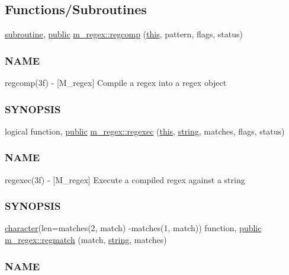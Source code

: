 \subsection*{Functions/\+Subroutines}
\begin{DoxyCompactItemize}
\item 
\hyperlink{M__stopwatch_83_8txt_acfbcff50169d691ff02d4a123ed70482}{subroutine}, \hyperlink{M__stopwatch_83_8txt_a2f74811300c361e53b430611a7d1769f}{public} \hyperlink{namespacem__regex_ac4e468cb031565f4f4744d8f4c9eee91}{m\+\_\+regex\+::regcomp} (\hyperlink{M__stopwatch_83_8txt_ad62a52042bb610eee5b36b5516caec22}{this}, pattern, flags, status)
\begin{DoxyCompactList}\small\item\em \subsubsection*{N\+A\+ME}

regcomp(3f) -\/ \mbox{[}M\+\_\+regex\mbox{]} Compile a regex into a regex object \subsubsection*{S\+Y\+N\+O\+P\+S\+IS}\end{DoxyCompactList}\item 
logical function, \hyperlink{M__stopwatch_83_8txt_a2f74811300c361e53b430611a7d1769f}{public} \hyperlink{namespacem__regex_a44394d605b1a98fb246bc4622a08f878}{m\+\_\+regex\+::regexec} (\hyperlink{M__stopwatch_83_8txt_ad62a52042bb610eee5b36b5516caec22}{this}, \hyperlink{what__overview_81_8txt_a74cb7e955273b9f9157b4f0c18a38849}{string}, matches, flags, status)
\begin{DoxyCompactList}\small\item\em \subsubsection*{N\+A\+ME}

regexec(3f) -\/ \mbox{[}M\+\_\+regex\mbox{]} Execute a compiled regex against a string \subsubsection*{S\+Y\+N\+O\+P\+S\+IS}\end{DoxyCompactList}\item 
\hyperlink{option__stopwatch_83_8txt_abd4b21fbbd175834027b5224bfe97e66}{character}(len=matches(2, match) -\/matches(1, match)) function, \hyperlink{M__stopwatch_83_8txt_a2f74811300c361e53b430611a7d1769f}{public} \hyperlink{namespacem__regex_a87c92921c53d800b316b0772140a8373}{m\+\_\+regex\+::regmatch} (match, \hyperlink{what__overview_81_8txt_a74cb7e955273b9f9157b4f0c18a38849}{string}, matches)
\begin{DoxyCompactList}\small\item\em \subsubsection*{N\+A\+ME}


\end{DoxyCompactList}
\end{DoxyCompactItemize}
